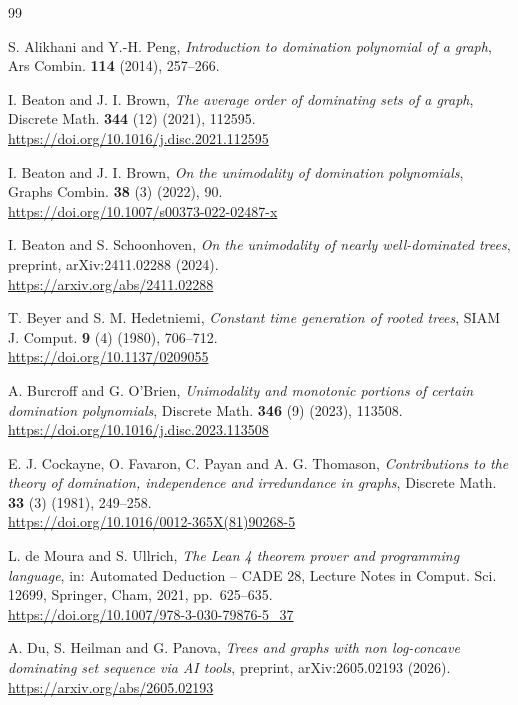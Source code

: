 \documentclass[11pt,a4paper]{article}
\theoremstyle{definition}
\begin{document}
\begin{thebibliography}{99}

 S. Alikhani and Y.-H. Peng,
{\it Introduction to domination polynomial of a graph},
Ars Combin. {\bf 114} (2014), 257--266.

 I. Beaton and J. I. Brown,
{\it The average order of dominating sets of a graph},
Discrete Math. {\bf 344} (12) (2021), 112595.
\\ {\tiny \url{https://doi.org/10.1016/j.disc.2021.112595} }

 I. Beaton and J. I. Brown,
{\it On the unimodality of domination polynomials},
Graphs Combin. {\bf 38} (3) (2022), 90.
\\ {\tiny \url{https://doi.org/10.1007/s00373-022-02487-x} }

 I. Beaton and S. Schoonhoven,
{\it On the unimodality of nearly well-dominated trees},
preprint, arXiv:2411.02288 (2024).
\\ {\tiny \url{https://arxiv.org/abs/2411.02288} }

 T. Beyer and S. M. Hedetniemi,
{\it Constant time generation of rooted trees},
SIAM J. Comput. {\bf 9} (4) (1980), 706--712.
\\ {\tiny \url{https://doi.org/10.1137/0209055} }

 A. Burcroff and G. O'Brien,
{\it Unimodality and monotonic portions of certain domination polynomials},
Discrete Math. {\bf 346} (9) (2023), 113508.
\\ {\tiny \url{https://doi.org/10.1016/j.disc.2023.113508} }

 E. J. Cockayne, O. Favaron, C. Payan and A. G. Thomason,
{\it Contributions to the theory of domination, independence and irredundance in graphs},
Discrete Math. {\bf 33} (3) (1981), 249--258.
\\ {\tiny \url{https://doi.org/10.1016/0012-365X(81)90268-5} }

 L. de Moura and S. Ullrich,
{\it The Lean 4 theorem prover and programming language},
in: Automated Deduction -- CADE 28, Lecture Notes in Comput. Sci. 12699, Springer, Cham, 2021, pp.~625--635.
\\ {\tiny \url{https://doi.org/10.1007/978-3-030-79876-5_37} }

 A. Du, S. Heilman and G. Panova,
{\it Trees and graphs with non log-concave dominating set sequence via AI tools},
preprint, arXiv:2605.02193 (2026).
\\ {\tiny \url{https://arxiv.org/abs/2605.02193} }


\end{thebibliography}
\end{document}
